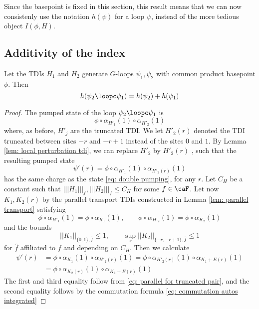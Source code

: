 Since the basepoint is fixed in this section, this result means that we can now consistenly use the notation $h(\psi)$ for a loop $\psi$, instead of the more tedious object $I(\phi,H)$. 


\subsection{Additivity of the index}

\begin{lemma} \label{lem: additivity}
	Let the TDIs $H_1$ and $H_2$ generate $G$-loops $\psi_1,\psi_2 $ with common product basepoint $\phi$.  Then
	$$
	h(\psi_2\loopc \psi_1)=h(\psi_2)+h(\psi_1)
	$$
\end{lemma}

\begin{proof}
	The pumped state of the loop $\psi_2\loopc \psi_1$ is 
	\begin{equation}  \label{eq: double pumping}
	\phi \circ \alpha_{H'_1}(1) \circ \alpha_{H'_2}(1)
	\end{equation}
	where, as before, $H'_{j}$ are the truncated TDI. We let  $H'_2(r)$ denoted the TDI truncated between sites $-r$ and $-r+1$ instead of the sites $0$ and $1$. By Lemma \ref{lem: local perturbation tdi}, we can replace $H'_2$ by $H'_2(r)$ , such that the resulting pumped state
	$$
	\psi'(r)=\phi \circ \alpha_{H'_1}(1) \circ \alpha_{H'_2(r)}(1)
	$$
	has the same charge as  the state \eqref{eq: double pumping}, for any $r$. 
	Let $C_H$ be a constant such that $|||H_1|||_f,|||H_2|||_f\leq C_H$ for some $f\in\caF$.
	Let now $K_1,K_2(r)$ by the parallel transport TDIs constructed in Lemma \ref{lem: parallel transport} satisfying
	\begin{equation}\label{eq: parallel for truncated pair}
	\phi \circ \alpha_{H'_1}(1)=\phi \circ \alpha_{K_1}(1) ,\qquad\phi \circ \alpha_{H'_2}(1)=\phi \circ \alpha_{K_2}(1)
	\end{equation}
	and the bounds 
	$$
	||K_1||_{\{0,1\}, \hat{f}} \leq  1,\qquad  \sup_r ||K_2||_{\{-r,-r+1\}, \hat{f}} \leq  1 
	$$
	for $\hat{f}$ affiliated to $f$ and depending on $C_H$.
	Then we calculate 
	\begin{align}
	\psi'(r) &= \phi \circ \alpha_{K_1}(1) \circ \alpha_{H'_2(r)}(1) 
	=\phi \circ \alpha_{H'_2(r)}(1) \circ \alpha_{K_1+E(r)}(1) \nonumber \\
	&=\phi \circ \alpha_{K_2(r)}(1) \circ \alpha_{K_1+E(r)}(1)\label{eq: double pumped repeat} 
	\end{align}
	The first and third equality follow from \eqref{eq: parallel for truncated pair}, and the second equality follows by the commutation formula \eqref{eq: commutation autos integrated}

\end{proof}
